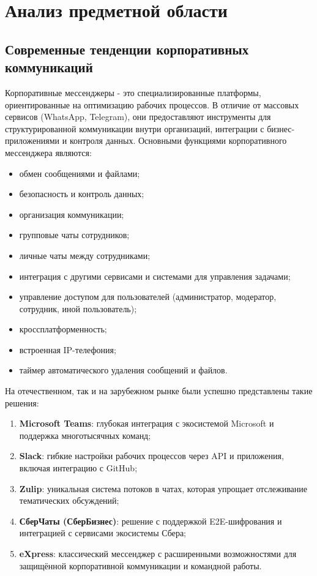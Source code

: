 \section{Анализ предметной области}
\subsection{Современные тенденции корпоративных коммуникаций}

Корпоративные мессенджеры - это специализированные платформы, ориентированные на оптимизацию рабочих процессов. В отличие от массовых сервисов (WhatsApp, Telegram), они предоставляют инструменты для структурированной коммуникации внутри организаций, интеграции с бизнес-приложениями и контроля данных.
Основными функциями корпоративного мессенджера являются:
\begin{itemize}
	\item обмен сообщениями и файлами;
	\item безопасность и контроль данных;
	\item организация коммуникации;
	\item групповые чаты сотрудников;
	\item личные чаты между сотрудниками;
	\item интеграция с другими сервисами и системами для управления задачами;
	\item управление доступом для пользователей (администратор, модератор, сотрудник, иной пользователь);
	\item кроссплатформенность;
	\item встроенная IP-телефония;
	\item таймер автоматического удаления сообщений и файлов.
\end{itemize}


На отечественном, так и на зарубежном рынке были успешно представлены такие решения:
\begin{enumerate}
	\item \textbf {Microsoft Teams}: глубокая интеграция с экосистемой Microsoft и поддержка многотысячных команд;
	\item \textbf {Slack}: гибкие настройки рабочих процессов через API и приложения, включая интеграцию с GitHub;
	\item \textbf {Zulip}: уникальная система потоков в чатах, которая упрощает отслеживание тематических обсуждений;
	\item \textbf {СберЧаты (СберБизнес)}: решение с поддержкой E2E-шифрования и интеграцией с сервисами экосистемы Сбера;
	\item \textbf {eXpress}: классический мессенджер с расширенными возможностями для защищённой корпоративной коммуникации и командной работы.
\end{enumerate}

